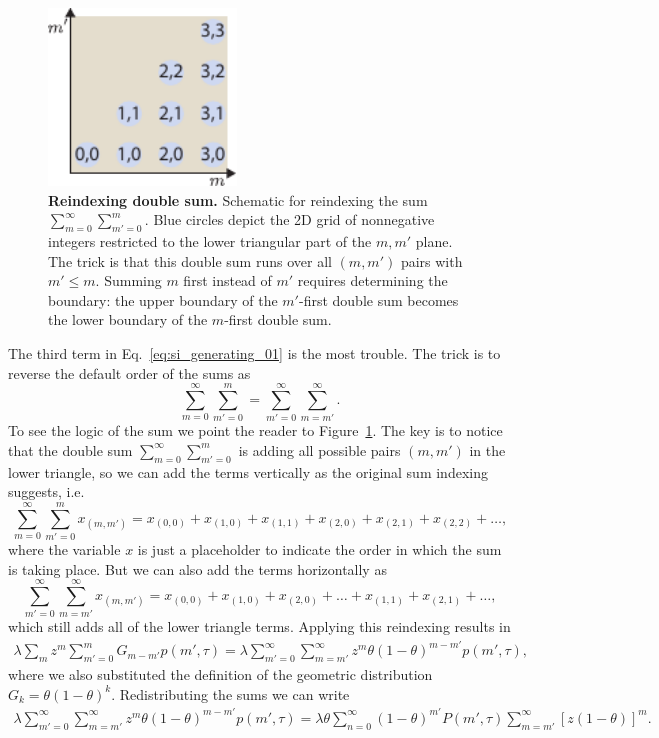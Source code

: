 \begin{figure}[h!]
\centering
\includegraphics[width=5cm]{../figures/si/figS0X_reindex_sum.pdf}
\caption{\textbf{Reindexing double sum.} Schematic for reindexing the sum
$\sum_{m=0}^\infty \sum_{m'=0}^m$. Blue circles depict the 2D grid of
nonnegative integers restricted to the lower triangular part of the $m, m'$
plane. The trick is that this double sum runs over all $(m, m')$ pairs with
$m'\le m$. Summing $m$ first instead of $m'$ requires determining the
boundary: the upper boundary of the $m'$-first double sum becomes the
lower boundary of the $m$-first double sum.}
\label{figS2:sum_reindex}
\end{figure}

The third term in Eq.~\ref{eq:si_generating_01} is the most trouble. The trick
is to reverse the default order of the sums as
\begin{equation}
\sum_{m=0}^{\infty} \sum_{m'=0}^{m} = \sum_{m'=0}^{\infty} \sum_{m=m'}^{\infty}.
\end{equation}
To see the logic of the sum we point the reader to
Figure~\ref{figS2:sum_reindex}. The key is to notice that the double sum
$\sum_{m=0}^\infty \sum_{m'=0}^m$ is adding all possible pairs $(m, m')$ in the
lower triangle, so we can add the terms vertically as the original sum
indexing suggests, i.e.
\begin{equation}
\sum_{m=0}^{\infty} \sum_{m'=0}^{m} x_{(m, m')}= 
x_{(0, 0)} + x_{(1, 0)} + x_{(1, 1)} + x_{(2, 0)} + x_{(2, 1)} + x_{(2, 2)} + 
\ldots,
\end{equation}
where the variable $x$ is just a placeholder to indicate the order in which the
sum is taking place. But we can also add the terms horizontally as
\begin{equation}
\sum_{m'=0}^{\infty} \sum_{m=m'}^{\infty} x_{(m, m')} =
x_{(0, 0)} + x_{(1, 0)} + x_{(2, 0)} + \ldots + x_{(1,1)} + x_{(2, 1)} + \ldots,
\end{equation}
which still adds all of the lower triangle terms. Applying this reindexing
results in
\begin{align}
\lambda \sum_m z^m \sum_{m'=0}^m G_{m-m'} p(m', \tau) =
\lambda \sum_{m'=0}^{\infty} \sum_{m=m'}^{\infty} z^m 
\theta (1 - \theta)^{m-m'} p(m', \tau),
\end{align}
where we also substituted the definition of the geometric distribution $G_{k} =
\theta (1 - \theta)^k$. Redistributing the sums we can write
\begin{align}
\lambda \sum_{m'=0}^{\infty} \sum_{m=m'}^{\infty} z^m 
\theta (1 - \theta)^{m-m'} p(m', \tau) = 
\lambda \theta \sum_{n=0}^{\infty}(1-\theta)^{m'} P(m', \tau) 
\sum_{m=m'}^{\infty} \left[z (1-\theta)\right]^{m}.
\label{eq:si_generating_02}
\end{align}

